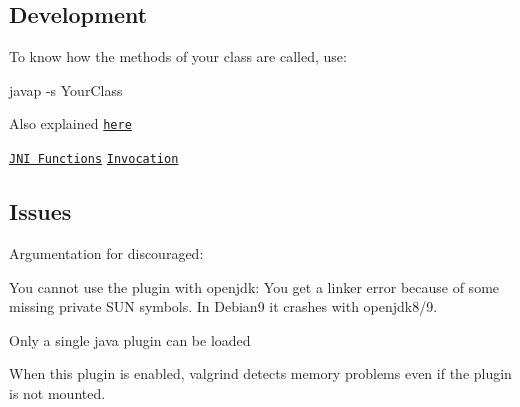\subsection*{Development}

To know how the methods of your class are called, use\+: \begin{DoxyVerb}javap -s YourClass
\end{DoxyVerb}


Also explained \href{https://docs.oracle.com/javase/7/docs/technotes/guides/jni/spec/types.html#wp15773}{\tt here}

\href{https://docs.oracle.com/javase/7/docs/technotes/guides/jni/spec/functions.html}{\tt J\+NI Functions} \href{https://docs.oracle.com/javase/7/docs/technotes/guides/jni/spec/invocation.html}{\tt Invocation}

\subsection*{Issues}

Argumentation for discouraged\+:


\begin{DoxyItemize}
\item You cannot use the plugin with openjdk\+: You get a linker error because of some missing private S\+UN symbols. In Debian9 it crashes with openjdk8/9.
\item Only a single java plugin can be loaded
\item When this plugin is enabled, valgrind detects memory problems even if the plugin is not mounted. 
\end{DoxyItemize}